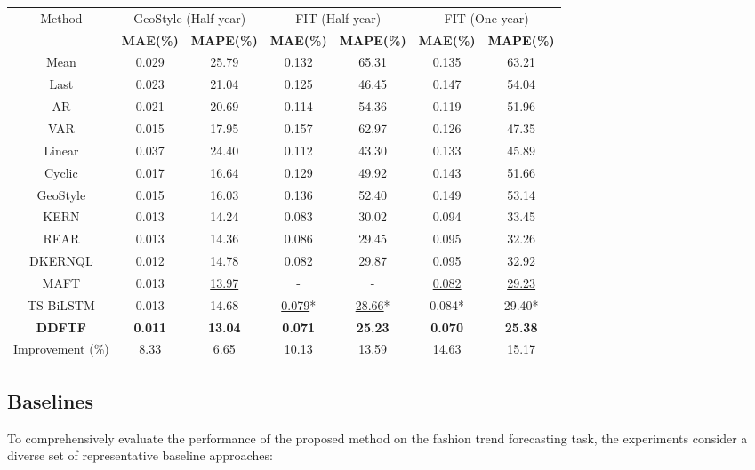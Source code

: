 \documentclass[Afour,sageh,times]{sagej}
\begin{document}
{\begin{table}[t]
\label{tab:overall_performance}
\begin{tabular}{c|cc|cc|cc}
\hline
\multirow{2}{*}{Method} 
& \multicolumn{2}{c|}{GeoStyle (Half-year)} 
& \multicolumn{2}{c|}{FIT (Half-year)} 
& \multicolumn{2}{c}{FIT (One-year)} \\
& \textbf{MAE(\%)}& \textbf{MAPE(\%)} & \textbf{MAE(\%)} & \textbf{MAPE(\%)} & \textbf{MAE(\%)} & \textbf{MAPE(\%)} \\
\hline
Mean        & 0.029 & 25.79 & 0.132  & 65.31 & 0.135  & 63.21 \\
Last        & 0.023 & 21.04 & 0.125  & 46.45 & 0.147  & 54.04 \\
AR          & 0.021 & 20.69 & 0.114  & 54.36 & 0.119  & 51.96 \\
VAR         & 0.015 & 17.95 & 0.157  & 62.97 & 0.126  & 47.35 \\
Linear      & 0.037 & 24.40 & 0.112  & 43.30 & 0.133  & 45.89 \\
Cyclic      & 0.017 & 16.64 & 0.129  & 49.92 & 0.143  & 51.66 \\
GeoStyle    & 0.015 & 16.03 & 0.136  & 52.40 & 0.149  & 53.14 \\
KERN        & 0.013 & 14.24 & 0.083  & 30.02 & 0.094  & 33.45 \\
REAR        & 0.013 & 14.36 & 0.086  & 29.45 & 0.095  & 32.26 \\
DKERNQL	    &\underline{0.012}& 14.78 & 0.082 &29.87 &0.095	&32.92 \\
MAFT        & 0.013 & \underline{13.97} & - & - & \underline{0.082} & \underline{29.23}  \\
TS-BiLSTM   & 0.013	& 14.68	&\underline{0.079}*	&\underline{28.66}*	&{0.084}* &{29.40}* \\
\hline
\textbf{DDFTF} 
            & \textbf{0.011} & \textbf{13.04} 
            & \textbf{0.071} & \textbf{25.23} 
            & \textbf{0.070} & \textbf{25.38} \\
Improvement (\%) 
            & 8.33 & 6.65 & 10.13 & 13.59 & 14.63 & 15.17 \\
\hline
\end{tabular}
\end{table}


\subsection{Baselines}
To comprehensively evaluate the performance of the proposed method on the fashion trend forecasting task, the experiments consider a diverse set of representative baseline approaches:

}
\end{document}
